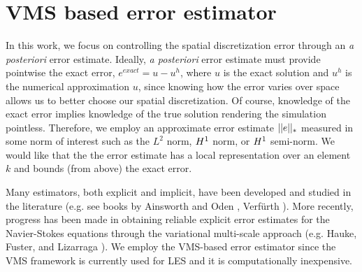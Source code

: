 \chapter{VMS based error estimator}

\label{chapter:APEE} %

In this work, we focus on controlling the spatial discretization error through an \textit{a posteriori} error estimate.
Ideally, \textit{a posteriori} error estimate must provide pointwise the exact error, $e^{exact}=u-u^h$, where $u$ is the exact solution and $u^h$ is the numerical approximation $u$, since knowing how the error varies over space allows us to better choose our spatial discretization. 
Of course, knowledge of the exact error implies knowledge of the true solution rendering the simulation pointless.
Therefore, we employ an approximate error estimate $||e||_{*}$ measured in some norm of interest such as the $L^2$ norm, $H^{1}$ norm, or $H^{1}$ semi-norm.
We would like that the the error estimate has a local representation over an element $k$ and bounds (from above) the exact error.




Many estimators, both explicit and implicit, have been developed and studied in the literature (e.g. see books by Ainsworth and Oden \cite{ainsworth2011book}, Verf\"urth \cite{verfurth2013posteriori}).
More recently, progress has been made in obtaining reliable explicit error estimates for the Navier-Stokes equations through the variational multi-scale approach (e.g. Hauke, Fuster, and Lizarraga \cite{hauke2015variational}).
We employ the VMS-based error estimator since the VMS framework is currently used for LES and it is computationally inexpensive.

